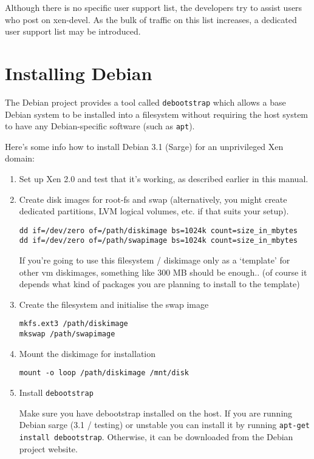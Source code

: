 \documentclass[11pt,twoside,final,openright]{xenstyle}
\begin{document}
{Although there is no specific user support list, the developers try to
assist users who post on xen-devel.  As the bulk of traffic on this
list increases, a dedicated user support list may be introduced.

\appendix

\chapter{Installing Debian}

The Debian project provides a tool called {\tt debootstrap} which
allows a base Debian system to be installed into a filesystem without
requiring the host system to have any Debian-specific software (such
as {\tt apt}).

Here's some info how to install Debian 3.1 (Sarge) for an unprivileged
Xen domain:

\begin{enumerate}
\item Set up Xen 2.0 and test that it's working, as described earlier in
      this manual.

\item Create disk images for root-fs and swap (alternatively, you
      might create dedicated partitions, LVM logical volumes, etc. if
      that suits your setup).
\begin{verbatim}  
dd if=/dev/zero of=/path/diskimage bs=1024k count=size_in_mbytes
dd if=/dev/zero of=/path/swapimage bs=1024k count=size_in_mbytes
\end{verbatim}
      If you're going to use this filesystem / diskimage only as a
      `template' for other vm diskimages, something like 300 MB should
      be enough.. (of course it depends what kind of packages you are
      planning to install to the template)

\item Create the filesystem and initialise the swap image
\begin{verbatim}
mkfs.ext3 /path/diskimage
mkswap /path/swapimage
\end{verbatim}

\item Mount the diskimage for installation
\begin{verbatim}
mount -o loop /path/diskimage /mnt/disk
\end{verbatim}

\item Install {\tt debootstrap}

Make sure you have debootstrap installed on the host.  If you are
running Debian sarge (3.1 / testing) or unstable you can install it by
running {\tt apt-get install debootstrap}.  Otherwise, it can be
downloaded from the Debian project website.


\end{enumerate}}
\end{document}
